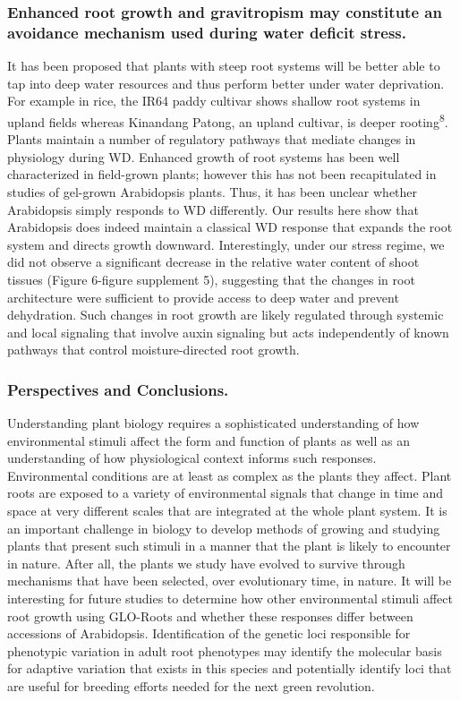 \documentclass[]{article}
\begin{document}
\subsubsection{Enhanced root growth and gravitropism may constitute an
avoidance mechanism used during water deficit
stress.}\label{enhanced-root-growth-and-gravitropism-may-constitute-an-avoidance-mechanism-used-during-water-deficit-stress.}

It has been proposed that plants with steep root systems will be better
able to tap into deep water resources and thus perform better under
water deprivation. For example in rice, the IR64 paddy cultivar shows
shallow root systems in upland fields whereas Kinandang Patong, an
upland cultivar, is deeper rooting\textsuperscript{8}. Plants maintain a
number of regulatory pathways that mediate changes in physiology during
WD. Enhanced growth of root systems has been well characterized in
field-grown plants; however this has not been recapitulated in studies
of gel-grown Arabidopsis plants. Thus, it has been unclear whether
Arabidopsis simply responds to WD differently. Our results here show
that Arabidopsis does indeed maintain a classical WD response that
expands the root system and directs growth downward. Interestingly,
under our stress regime, we did not observe a significant decrease in
the relative water content of shoot tissues (Figure 6-figure supplement
5), suggesting that the changes in root architecture were sufficient to
provide access to deep water and prevent dehydration. Such changes in
root growth are likely regulated through systemic and local signaling
that involve auxin signaling but acts independently of known pathways
that control moisture-directed root growth.

\subsubsection{Perspectives and
Conclusions.}\label{perspectives-and-conclusions.}

Understanding plant biology requires a sophisticated understanding of
how environmental stimuli affect the form and function of plants as well
as an understanding of how physiological context informs such responses.
Environmental conditions are at least as complex as the plants they
affect. Plant roots are exposed to a variety of environmental signals
that change in time and space at very different scales that are
integrated at the whole plant system. It is an important challenge in
biology to develop methods of growing and studying plants that present
such stimuli in a manner that the plant is likely to encounter in
nature. After all, the plants we study have evolved to survive through
mechanisms that have been selected, over evolutionary time, in nature.
It will be interesting for future studies to determine how other
environmental stimuli affect root growth using GLO-Roots and whether
these responses differ between accessions of Arabidopsis. Identification
of the genetic loci responsible for phenotypic variation in adult root
phenotypes may identify the molecular basis for adaptive variation that
exists in this species and potentially identify loci that are useful for
breeding efforts needed for the next green revolution.
\end{document}
